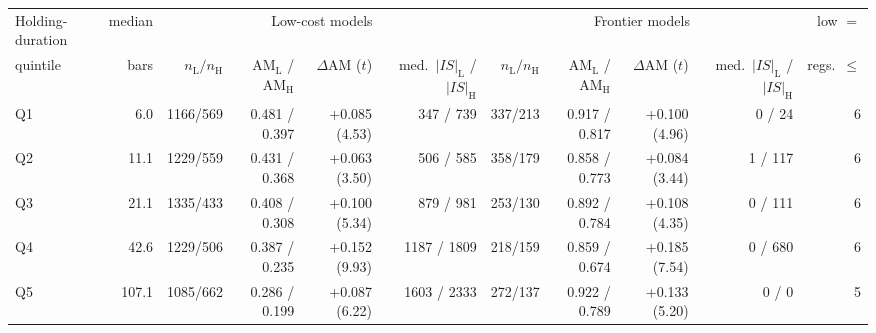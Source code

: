 \begin{tabular}{lrrrrrrrrrr}
\toprule
Holding-duration & median & \multicolumn{4}{c}{Low-cost models} & \multicolumn{4}{c}{Frontier models} & low $=$ \\
\cmidrule(lr){3-6}\cmidrule(lr){7-10}
quintile & bars & $n_{\mathrm{L}}/n_{\mathrm{H}}$ & AM$_{\mathrm{L}}$ / AM$_{\mathrm{H}}$ & $\Delta$AM ($t$) & med.\ $|IS|_{\mathrm{L}}$ / $|IS|_{\mathrm{H}}$ & $n_{\mathrm{L}}/n_{\mathrm{H}}$ & AM$_{\mathrm{L}}$ / AM$_{\mathrm{H}}$ & $\Delta$AM ($t$) & med.\ $|IS|_{\mathrm{L}}$ / $|IS|_{\mathrm{H}}$ & regs.\ $\le$ \\
\midrule
Q1 & 6.0 & 1166/569 & 0.481 / 0.397 & +0.085 (4.53) & 347 / 739 & 337/213 & 0.917 / 0.817 & +0.100 (4.96) & 0 / 24 & 6 \\
Q2 & 11.1 & 1229/559 & 0.431 / 0.368 & +0.063 (3.50) & 506 / 585 & 358/179 & 0.858 / 0.773 & +0.084 (3.44) & 1 / 117 & 6 \\
Q3 & 21.1 & 1335/433 & 0.408 / 0.308 & +0.100 (5.34) & 879 / 981 & 253/130 & 0.892 / 0.784 & +0.108 (4.35) & 0 / 111 & 6 \\
Q4 & 42.6 & 1229/506 & 0.387 / 0.235 & +0.152 (9.93) & 1187 / 1809 & 218/159 & 0.859 / 0.674 & +0.185 (7.54) & 0 / 680 & 6 \\
Q5 & 107.1 & 1085/662 & 0.286 / 0.199 & +0.087 (6.22) & 1603 / 2333 & 272/137 & 0.922 / 0.789 & +0.133 (5.20) & 0 / 0 & 5 \\
\bottomrule
\end{tabular}
